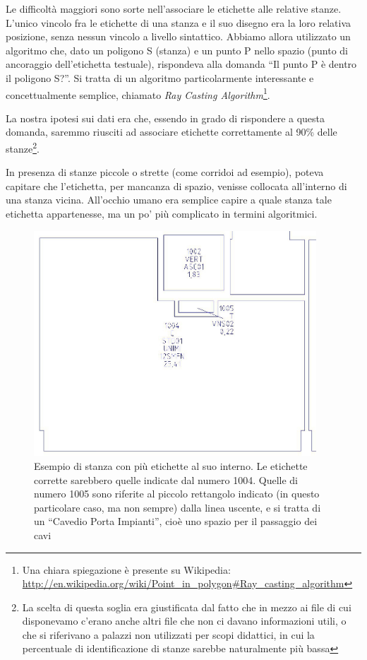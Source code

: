 \documentclass[12pt]{report}
\begin{document}
Le difficoltà maggiori sono sorte nell'associare le etichette alle
relative stanze. L'unico vincolo fra le etichette di una stanza e il
suo disegno era la loro relativa posizione, senza nessun vincolo a
livello sintattico. Abbiamo allora utilizzato un algoritmo che, dato
un poligono S (stanza) e un punto P nello spazio (punto di ancoraggio
dell'etichetta testuale), rispondeva alla domanda ``Il punto P è
dentro il poligono S?''. Si tratta di un algoritmo particolarmente
interessante e concettualmente semplice, chiamato \textit{Ray Casting
Algorithm}\footnote{Una chiara spiegazione è presente su Wikipedia:
\url{http://en.wikipedia.org/wiki/Point_in_polygon\#Ray_casting_algorithm}}.

La nostra ipotesi sui dati era che, essendo in grado di rispondere a
questa domanda, saremmo riusciti ad associare etichette correttamente
al 90\% delle stanze\footnote{La scelta di questa soglia era
giustificata dal fatto che in mezzo ai file di cui disponevamo c'erano
anche altri file che non ci davano informazioni utili, o che si
riferivano a palazzi non utilizzati per scopi didattici, in cui la
percentuale di identificazione di stanze sarebbe naturalmente più bassa}.

In presenza di stanze piccole o strette (come corridoi ad esempio),
poteva capitare che l'etichetta, per mancanza di spazio, venisse
collocata all'interno di una stanza vicina. All'occhio umano era
semplice capire a quale stanza tale etichetta appartenesse, ma un po'
più complicato in termini algoritmici.

\begin{figure}[h]
    \centering
    \includegraphics[width=300pt]{03-dxf-stanza-etichette-fuori.jpg}
    \caption{Esempio di stanza con più etichette al suo interno. Le
etichette corrette sarebbero quelle indicate dal numero 1004. Quelle
di numero 1005 sono riferite al piccolo rettangolo indicato (in questo
particolare caso, ma non sempre) dalla linea uscente, e si tratta di
un ``Cavedio Porta Impianti'', cioè uno spazio per il passaggio dei cavi}
    \label{fig:dxf_room_labels}
\end{figure}
\end{document}
